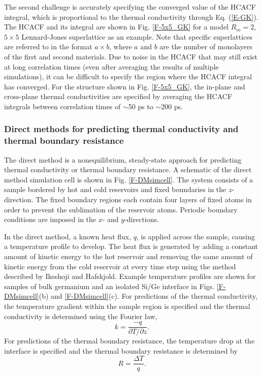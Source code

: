 \documentclass[letterpaper,12pt]{article}
\begin{document}
The second challenge is accurately specifying the converged value of
the HCACF integral, which is proportional to the thermal
conductivity through Eq. (\ref{E-GK}). The HCACF and its integral
are shown in Fig$.$ \ref{F-5x5_GK} for a model $R_m = 2$, $5\times5$
Lennard-Jones superlattice as an example. Note that specific
superlattices are referred to in the format $a \times b$, where $a$
and $b$ are the number of monolayers of the first and second
materials. Due to noise in the HCACF that may still exist at long
correlation times (even after averaging the results of multiple
simulations), it can be difficult to specify the region where the
HCACF integral has converged. For the structure shown in Fig$.$
\ref{F-5x5_GK}, the in-plane and cross-plane thermal conductivities
are specified by averaging the HCACF integrals between correlation
times of $\sim$50 ps to $\sim$200 ps.

\subsubsection*{\label{S-MD-DM}Direct methods for predicting thermal conductivity and thermal boundary resistance}

The direct method is a nonequilibrium, steady-state approach for
predicting thermal conductivity or thermal boundary
resistance.\cite{schelling2002,mcgaughey2006book} A schematic of the
direct method simulation cell is shown in Fig$.$ \ref{F-DMsimcell}.
The system consists of a sample bordered by hot and cold reservoirs
and fixed boundaries in the $z$-direction. The fixed boundary
regions each contain four layers of fixed atoms in order to prevent
the sublimation of the reservoir atoms. Periodic boundary conditions
are imposed in the $x$- and $y$-directions.

In the direct method, a known heat flux, $q$, is applied across the
sample, causing a temperature profile to develop. The heat flux is
generated by adding a constant amount of kinetic energy to the hot
reservoir and removing the same amount of kinetic energy from the
cold reservoir at every time step using the method described by
Ikeshoji and Hafskjold.\cite{ikeshoji1994} Example temperature
profiles are shown for samples of bulk germanium and an isolated
Si/Ge interface in Figs. \ref{F-DMsimcell}(b) and
\ref{F-DMsimcell}(c). For predictions of the thermal conductivity,
the temperature gradient within the sample region is specified and
the thermal conductivity is determined using the Fourier law,
\begin{equation}
k = \frac{-q}{\partial T/\partial z}. \label{E-kFourier}
\end{equation}
For predictions of the thermal boundary resistance, the temperature
drop at the interface is specified and the thermal boundary
resistance is determined by
\begin{equation}
R = \frac{\Delta T}{q}. \label{E-DM-R}
\end{equation}
\end{document}
